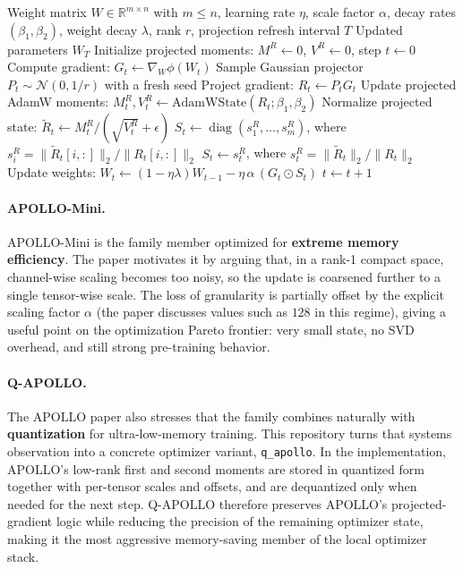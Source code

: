 \begin{algorithm}[H]
\caption{APOLLO / APOLLO-Mini Structured Gradient Scaling}
\label{alg:apollo-family}
\begin{algorithmic}[1]
\Require Weight matrix $W \in \mathbb{R}^{m \times n}$ with $m \le n$, learning rate $\eta$, scale factor $\alpha$, decay rates $(\beta_1, \beta_2)$, weight decay $\lambda$, rank $r$, projection refresh interval $T$
\Ensure Updated parameters $W_T$
\State Initialize projected moments: $M^R \gets 0$, $V^R \gets 0$, step $t \gets 0$
\Repeat
    \State Compute gradient: $G_t \gets \nabla_W \phi(W_t)$
        \State Sample Gaussian projector $P_t \sim \mathcal{N}(0, 1/r)$ with a fresh seed
    \EndIf
    \State Project gradient: $R_t \gets P_t G_t$ 
    \State Update projected AdamW moments: $M_t^R, V_t^R \gets \text{AdamWState}(R_t; \beta_1, \beta_2)$
    \State Normalize projected state: $\widetilde{R}_t \gets M_t^R / (\sqrt{V_t^R}+\epsilon)$
        \State $S_t \gets \operatorname{diag}(s_1^R, \ldots, s_m^R)$, where $s_i^R = \|\widetilde{R}_t[i,:]\|_2 / \|R_t[i,:]\|_2$
    \Else
        \State $S_t \gets s_t^R$, where $s_t^R = \|\widetilde{R}_t\|_2 / \|R_t\|_2$
    \EndIf
    \State Update weights: $W_t \gets (1-\eta\lambda)W_{t-1} - \eta\,\alpha\,(G_t \odot S_t)$
    \State $t \gets t+1$
\end{algorithmic}
\end{algorithm}

\paragraph{APOLLO-Mini.}
APOLLO-Mini is the family member optimized for \textbf{extreme memory efficiency}. The paper motivates it by arguing that, in a rank-1 compact space, channel-wise scaling becomes too noisy, so the update is coarsened further to a single tensor-wise scale. The loss of granularity is partially offset by the explicit scaling factor $\alpha$ (the paper discusses values such as $128$ in this regime), giving a useful point on the optimization Pareto frontier: very small state, no SVD overhead, and still strong pre-training behavior.

\paragraph{Q-APOLLO.}
The APOLLO paper also stresses that the family combines naturally with \textbf{quantization} for ultra-low-memory training. This repository turns that systems observation into a concrete optimizer variant, \texttt{q\_apollo}. In the implementation, APOLLO's low-rank first and second moments are stored in quantized form together with per-tensor scales and offsets, and are dequantized only when needed for the next step. Q-APOLLO therefore preserves APOLLO's projected-gradient logic while reducing the precision of the remaining optimizer state, making it the most aggressive memory-saving member of the local optimizer stack.

